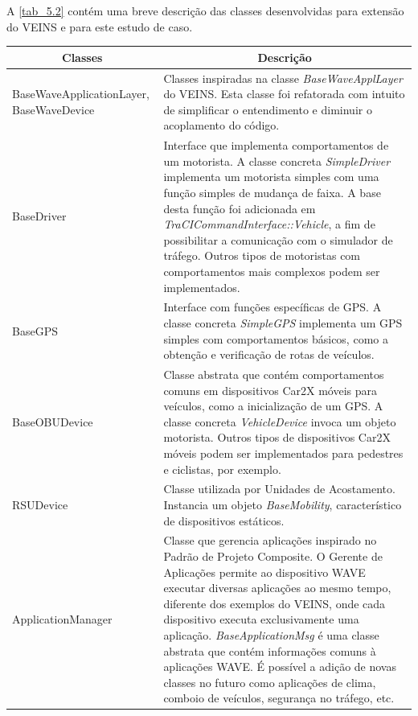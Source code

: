 \documentclass[
12pt,				%
openright,			%
oneside,			%
a4paper,			%
brazil,				%
]{abntex2}
\begin{document}
	A \autoref{tab_5.2} contém uma breve descrição das classes desenvolvidas para extensão do VEINS e para este estudo de caso.

    \begin{table}[H] %
    	\centering
	    \renewcommand{\arraystretch}{1.4}
	    \begin{tabular}{|p{4.8cm}|p{10.2cm}|}
    		\hline
    		\multicolumn{1}{|c|}{\textbf{Classes}} & \multicolumn{1}{c|}{\textbf{Descrição}} \\ \hline
    		BaseWaveApplicationLayer, BaseWaveDevice & Classes inspiradas na classe \textit{BaseWaveApplLayer} do VEINS. Esta classe foi refatorada com intuito de simplificar o entendimento e diminuir o acoplamento do código. \\ \hline
    		BaseDriver & Interface que implementa comportamentos de um motorista. A classe concreta \textit{SimpleDriver} implementa um motorista simples com uma função simples de mudança de faixa. A base desta função foi adicionada em \textit{TraCICommandInterface::Vehicle}, a fim de possibilitar a comunicação com o simulador de tráfego. Outros tipos de motoristas com comportamentos mais complexos podem ser implementados. \\ \hline
    		BaseGPS & Interface com funções específicas de GPS. A classe concreta \textit{SimpleGPS} implementa um GPS simples com comportamentos básicos, como a obtenção e verificação de rotas de veículos. \\ \hline
    		BaseOBUDevice & Classe abstrata que contém comportamentos comuns em dispositivos Car2X móveis para veículos, como a inicialização de um GPS. A classe concreta \textit{VehicleDevice} invoca um objeto motorista. Outros tipos de dispositivos Car2X móveis podem ser implementados para pedestres e ciclistas, por exemplo. \\ \hline
    		RSUDevice & Classe utilizada por Unidades de Acostamento. Instancia um objeto \textit{BaseMobility}, característico de dispositivos estáticos. \\ \hline
    		ApplicationManager & Classe que gerencia aplicações inspirado no Padrão de Projeto Composite. O Gerente de Aplicações permite ao dispositivo WAVE executar diversas aplicações ao mesmo tempo, diferente dos exemplos do VEINS, onde cada dispositivo executa exclusivamente uma aplicação. \textit{BaseApplicationMsg} é uma classe abstrata que contém informações comuns à aplicações WAVE. É possível a adição de novas classes no futuro como aplicações de clima, comboio de veículos, segurança no tráfego, etc. \\ \hline

\end{tabular}
\end{table}
\end{document}
